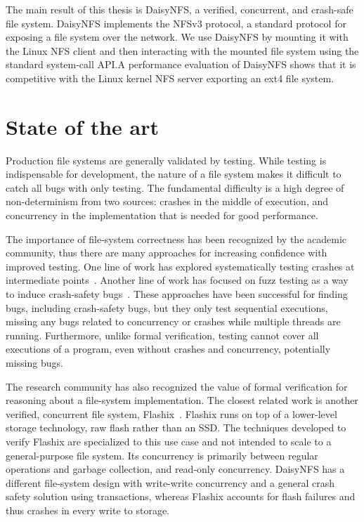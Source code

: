 The main result of this thesis is DaisyNFS, a verified, concurrent, and
crash-safe file system. DaisyNFS implements the NFSv3 protocol, a standard protocol for exposing
a file system over the network. We use DaisyNFS by mounting it with the
Linux NFS client and then interacting with the mounted file system using
the standard system-call API.\@ A performance evaluation of DaisyNFS shows
that it is competitive with the Linux kernel NFS server exporting an
ext4 file system.

\section{State of the art}

Production file systems are generally validated by testing. While testing is
indispensable for development, the nature of a file system makes it difficult to
catch all bugs with only testing. The fundamental difficulty is a high degree of
non-determinism from two sources: crashes in the middle of execution, and
concurrency in the implementation that is needed for good performance.

The importance of file-system correctness has been recognized by the academic
community, thus there are many approaches for increasing confidence with
improved testing. One line of work has explored systematically testing crashes
at intermediate points~\cite{mohan:crashmonkey,pillai:appcrash}. Another line of
work has focused on fuzz testing as a way to induce crash-safety
bugs~\cite{xu:janus,kim:hydra}. These approaches have been successful for
finding bugs, including crash-safety bugs, but they only test sequential
executions, missing any bugs related to concurrency or crashes while multiple
threads are running. Furthermore, unlike formal verification, testing cannot
cover all executions of a program, even without crashes and concurrency,
potentially missing bugs.

The research community has also recognized the value of formal verification for
reasoning about a file-system implementation. The closest related work is
another verified, concurrent file system,
Flashix~\cite{bodenmuller:concurrent-flashix}. Flashix runs on top of a
lower-level storage technology, raw flash rather than an SSD. The techniques
developed to verify Flashix are specialized to this use case and not intended to
scale to a general-purpose file system. Its concurrency is primarily between
regular operations and garbage collection, and read-only concurrency. DaisyNFS
has a different file-system design with write-write concurrency and a general
crash safety solution using transactions, whereas Flashix accounts for flash
failures and thus crashes in every write to storage.

